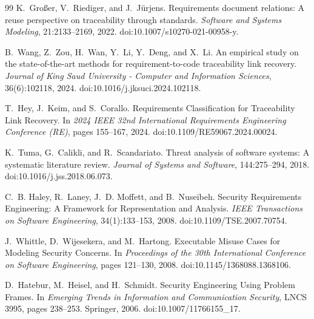 \documentclass[12pt,a4paper,oneside]{report}
\begin{document}
\begin{thebibliography}{99}
K.~Gro{\ss}er, V.~Riediger, and J.~J{\"u}rjens.
\newblock Requirements document relations: A reuse perspective on traceability through standards.
\newblock \emph{Software and Systems Modeling}, 21:2133--2169, 2022.
\newblock doi:10.1007/s10270-021-00958-y.

B.~Wang, Z.~Zou, H.~Wan, Y.~Li, Y.~Deng, and X.~Li.
\newblock An empirical study on the state-of-the-art methods for requirement-to-code traceability link recovery.
\newblock \emph{Journal of King Saud University - Computer and Information Sciences}, 36(6):102118, 2024.
\newblock doi:10.1016/j.jksuci.2024.102118.

T.~Hey, J.~Keim, and S.~Corallo.
\newblock Requirements Classification for Traceability Link Recovery.
\newblock In \emph{2024 IEEE 32nd International Requirements Engineering Conference (RE)}, pages 155--167, 2024.
\newblock doi:10.1109/RE59067.2024.00024.

K.~Tuma, G.~Calikli, and R.~Scandariato.
\newblock Threat analysis of software systems: A systematic literature review.
\newblock \emph{Journal of Systems and Software}, 144:275--294, 2018.
\newblock doi:10.1016/j.jss.2018.06.073.

C.~B. Haley, R.~Laney, J.~D. Moffett, and B.~Nuseibeh.
\newblock Security Requirements Engineering: A Framework for Representation and Analysis.
\newblock \emph{IEEE Transactions on Software Engineering}, 34(1):133--153, 2008.
\newblock doi:10.1109/TSE.2007.70754.

J.~Whittle, D.~Wijesekera, and M.~Hartong.
\newblock Executable Misuse Cases for Modeling Security Concerns.
\newblock In \emph{Proceedings of the 30th International Conference on Software Engineering}, pages 121--130, 2008.
\newblock doi:10.1145/1368088.1368106.

D.~Hatebur, M.~Heisel, and H.~Schmidt.
\newblock Security Engineering Using Problem Frames.
\newblock In \emph{Emerging Trends in Information and Communication Security}, LNCS 3995, pages 238--253. Springer, 2006.
\newblock doi:10.1007/11766155\_17.


\end{thebibliography}
\end{document}
